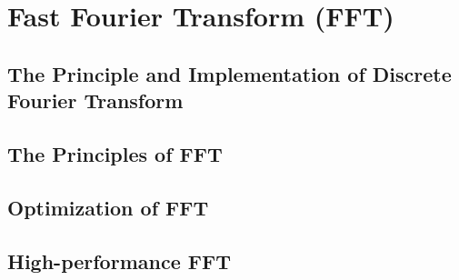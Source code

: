 
\chapter{Fast Fourier Transform (FFT)}

\section{The Principle and Implementation of Discrete Fourier Transform}

\section{The Principles of FFT}

\section{Optimization of FFT}

\section{High-performance FFT}